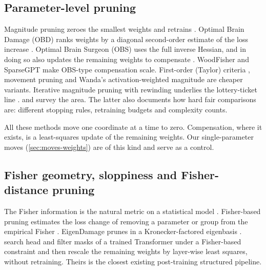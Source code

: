 \documentclass[11pt,a4paper]{article}
\theoremstyle{definition}
\begin{document}
\subsection{Parameter-level pruning}
\label{sec:rel-param}

Magnitude pruning zeroes the smallest weights and retrains \citep{han2015learning}.
Optimal Brain Damage (OBD) ranks weights by a diagonal second-order estimate of the
loss increase \citep{lecun1990obd}. Optimal Brain Surgeon (OBS) uses the full inverse
Hessian, and in doing so also updates the remaining weights to compensate
\citep{hassibi1993obs}. WoodFisher \citep{singh2020woodfisher} and SparseGPT
\citep{frantar2023sparsegpt} make OBS-type compensation scale. First-order
(Taylor) criteria \citep{molchanov2017taylor}, movement pruning
\citep{sanh2020movement} and Wanda's activation-weighted magnitude
\citep{sun2024wanda} are cheaper variants. Iterative magnitude pruning with rewinding
underlies the lottery-ticket line \citep{frankle2019lottery}.
\citet{hoefler2021sparsity} and \citet{blalock2020state} survey the area. The latter
also documents how hard fair comparisons are: different stopping rules, retraining
budgets and complexity counts.

All these methods move one coordinate at a time to zero. Compensation, where it
exists, is a least-squares update of the remaining weights. Our single-parameter
moves (\cref{sec:moves-weights}) are of this kind and serve as a control.

\subsection{Fisher geometry, sloppiness and Fisher-distance pruning}
\label{sec:rel-fisher}

The Fisher information is the natural metric on a statistical model
\citep{amari2000methods,amari2016}. Fisher-based pruning estimates the loss change of
removing a parameter or group from the empirical Fisher
\citep{theis2018fisher,liu2021groupfisher}. EigenDamage prunes in a Kronecker-factored
eigenbasis \citep{wang2019eigendamage}. \citet{kwon2022fast} search head and filter
masks of a trained Transformer under a Fisher-based constraint and then rescale the
remaining weights by layer-wise least squares, without retraining. Theirs is the
closest existing post-training structured pipeline.
\end{document}
